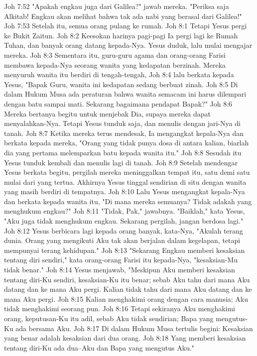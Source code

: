 Joh 7:52  "Apakah engkau juga dari Galilea?" jawab mereka. "Periksa saja Alkitab! Engkau akan melihat bahwa tak ada nabi yang berasal dari Galilea!"
Joh 7:53  Setelah itu, semua orang pulang ke rumah.
Joh 8:1  Tetapi Yesus pergi ke Bukit Zaitun.
Joh 8:2  Keesokan harinya pagi-pagi Ia pergi lagi ke Rumah Tuhan, dan banyak orang datang kepada-Nya. Yesus duduk, lalu mulai mengajar mereka.
Joh 8:3  Sementara itu, guru-guru agama dan orang-orang Farisi membawa kepada-Nya seorang wanita yang kedapatan berzinah. Mereka menyuruh wanita itu berdiri di tengah-tengah,
Joh 8:4  lalu berkata kepada Yesus, "Bapak Guru, wanita ini kedapatan sedang berbuat zinah.
Joh 8:5  Di dalam Hukum Musa ada peraturan bahwa wanita semacam ini harus dilempari dengan batu sampai mati. Sekarang bagaimana pendapat Bapak?"
Joh 8:6  Mereka bertanya begitu untuk menjebak Dia, supaya mereka dapat menyalahkan-Nya. Tetapi Yesus tunduk saja, dan menulis dengan jari-Nya di tanah.
Joh 8:7  Ketika mereka terus mendesak, Ia mengangkat kepala-Nya dan berkata kepada mereka, "Orang yang tidak punya dosa di antara kalian, biarlah dia yang pertama melemparkan batu kepada wanita itu."
Joh 8:8  Sesudah itu Yesus tunduk kembali dan menulis lagi di tanah.
Joh 8:9  Setelah mendengar Yesus berkata begitu, pergilah mereka meninggalkan tempat itu, satu demi satu mulai dari yang tertua. Akhirnya Yesus tinggal sendirian di situ dengan wanita yang masih berdiri di tempatnya.
Joh 8:10  Lalu Yesus mengangkat kepala-Nya dan berkata kepada wanita itu, "Di mana mereka semuanya? Tidak adakah yang menghukum engkau?"
Joh 8:11  "Tidak, Pak," jawabnya. "Baiklah," kata Yesus, "Aku juga tidak menghukum engkau. Sekarang pergilah, jangan berdosa lagi."
Joh 8:12  Yesus berbicara lagi kepada orang banyak, kata-Nya, "Akulah terang dunia. Orang yang mengikuti Aku tak akan berjalan dalam kegelapan, tetapi mempunyai terang kehidupan."
Joh 8:13  "Sekarang Engkau memberi kesaksian tentang diri sendiri," kata orang-orang Farisi itu kepada-Nya, "kesaksian-Mu tidak benar."
Joh 8:14  Yesus menjawab, "Meskipun Aku memberi kesaksian tentang diri-Ku sendiri, kesaksian-Ku itu benar; sebab Aku tahu dari mana Aku datang dan ke mana Aku pergi. Kalian tidak tahu dari mana Aku datang dan ke mana Aku pergi.
Joh 8:15  Kalian menghakimi orang dengan cara manusia; Aku tidak menghakimi seorang pun.
Joh 8:16  Tetapi sekiranya Aku menghakimi orang, keputusan-Ku itu adil, sebab Aku tidak sendirian; Bapa yang mengutus-Ku ada bersama Aku.
Joh 8:17  Di dalam Hukum Musa tertulis begini: Kesaksian yang benar adalah kesaksian dari dua orang.
Joh 8:18  Yang memberi kesaksian tentang diri-Ku ada dua--Aku dan Bapa yang mengutus Aku."
